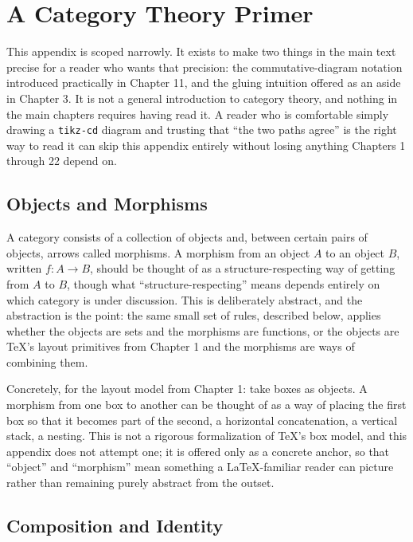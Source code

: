\hypertarget{appendix-b-a-category-theory-primer}{%
\chapter{A Category Theory Primer}\label{appendix-b-a-category-theory-primer}}

This appendix is scoped narrowly. It exists to make two things in the main text precise for a reader who wants that precision: the commutative-diagram notation introduced practically in Chapter 11, and the gluing intuition offered as an aside in Chapter 3. It is not a general introduction to category theory, and nothing in the main chapters requires having read it. A reader who is comfortable simply drawing a \texttt{tikz-cd} diagram and trusting that ``the two paths agree'' is the right way to read it can skip this appendix entirely without losing anything Chapters 1 through 22 depend on.

\hypertarget{b.1-objects-and-morphisms}{%
\section{Objects and Morphisms}\label{b.1-objects-and-morphisms}}

A category consists of a collection of objects and, between certain pairs of objects, arrows called morphisms. A morphism from an object \(A\) to an object \(B\), written \(f : A \to B\), should be thought of as a structure-respecting way of getting from \(A\) to \(B\), though what ``structure-respecting'' means depends entirely on which category is under discussion. This is deliberately abstract, and the abstraction is the point: the same small set of rules, described below, applies whether the objects are sets and the morphisms are functions, or the objects are TeX's layout primitives from Chapter 1 and the morphisms are ways of combining them.

Concretely, for the layout model from Chapter 1: take boxes as objects. A morphism from one box to another can be thought of as a way of placing the first box so that it becomes part of the second, a horizontal concatenation, a vertical stack, a nesting. This is not a rigorous formalization of TeX's box model, and this appendix does not attempt one; it is offered only as a concrete anchor, so that ``object'' and ``morphism'' mean something a LaTeX-familiar reader can picture rather than remaining purely abstract from the outset.

\hypertarget{b.2-composition-and-identity}{%
\section{Composition and Identity}\label{b.2-composition-and-identity}}

